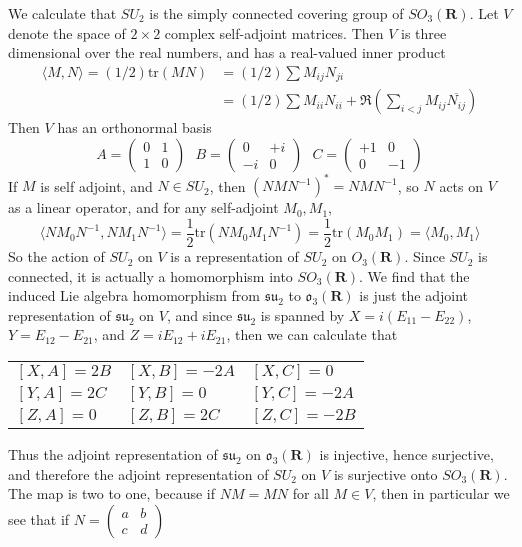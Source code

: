 \begin{example}
    We calculate that $SU_2$ is the simply connected covering group of $SO_3(\mathbf{R})$. Let $V$ denote the space of $2 \times 2$ complex self-adjoint matrices. Then $V$ is three dimensional over the real numbers, and has a real-valued inner product
    \begin{align*}
        \langle M, N \rangle = (1/2) \text{tr}(MN) &= (1/2) \sum M_{ij}N_{ji}\\
        &= (1/2) \sum M_{ii} N_{ii} + \Re \left( \sum_{i < j} M_{ij} \overline{N_{ij}} \right)
    \end{align*}
    Then $V$ has an orthonormal basis
    \[ A = \begin{pmatrix} 0 & 1 \\ 1 & 0 \end{pmatrix}\ \ \ B = \begin{pmatrix} 0 & +i \\ -i & 0 \end{pmatrix}\ \ \ C = \begin{pmatrix} +1 & 0 \\ 0 & -1 \end{pmatrix} \]
    If $M$ is self adjoint, and $N \in SU_2$, then $(NMN^{-1})^* = NMN^{-1}$, so $N$ acts on $V$ as a linear operator, and for any self-adjoint $M_0, M_1$,
    \[ \langle NM_0N^{-1}, NM_1N^{-1} \rangle = \frac{1}{2} \text{tr}(NM_0M_1N^{-1}) = \frac{1}{2} \text{tr}(M_0M_1) = \langle M_0, M_1 \rangle \]
    So the action of $SU_2$ on $V$ is a representation of $SU_2$ on $O_3(\mathbf{R})$. Since $SU_2$ is connected, it is actually a homomorphism into $SO_3(\mathbf{R})$. We find that the induced Lie algebra homomorphism from $\mathfrak{su}_2$ to $\mathfrak{o}_3(\mathbf{R})$ is just the adjoint representation of $\mathfrak{su}_2$ on $V$, and since $\mathfrak{su}_2$ is spanned by $X = i(E_{11} - E_{22})$, $Y = E_{12} - E_{21}$, and $Z = iE_{12} + iE_{21}$, then we can calculate that
    \begin{center}
    \begin{tabular}{lll}
        $[X,A] = 2B$ & $[X,B] = -2A$ & $[X,C] = 0$\\
        $[Y,A] = 2C$ & $[Y,B] = 0$ & $[Y,C] = -2A$\\
        $[Z,A] = 0$ & $[Z,B] = 2C$ & $[Z,C] = -2B$
    \end{tabular}
    \end{center}
    Thus the adjoint representation of $\mathfrak{su}_2$ on $\mathfrak{o}_3(\mathbf{R})$ is injective, hence surjective, and therefore the adjoint representation of $SU_2$ on $V$ is surjective onto $SO_3(\mathbf{R})$. The map is two to one, because if $NM = MN$ for all $M \in V$, then in particular we see that if $N = \left( \begin{smallmatrix} a & b \\ c & d \end{smallmatrix} \right)$

\end{example}
